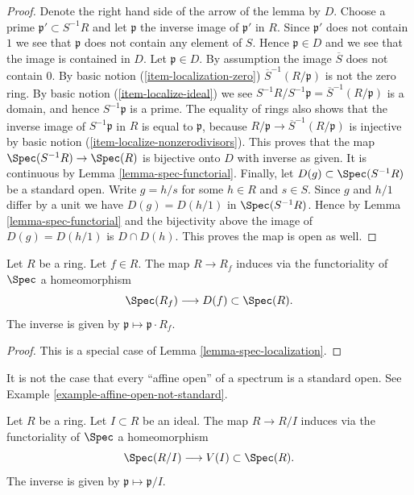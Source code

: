 \begin{proof}
Denote the right hand side of the arrow of the lemma by $D$.
Choose a prime $\mathfrak p' \subset S^{-1}R$ and let $\mathfrak p$
the inverse image of $\mathfrak p'$ in $R$. Since $\mathfrak p'$
does not contain $1$ we see that $\mathfrak p$ does not contain
any element of $S$. Hence $\mathfrak p \in D$ and we see that
the image is contained in $D$. Let $\mathfrak p \in D$.
By assumption the image $\overline{S}$ does not contain $0$.
By basic notion (\ref{item-localization-zero})
$\overline{S}^{-1}(R/\mathfrak p)$ is not the zero ring.
By basic notion (\ref{item-localize-ideal}) we see
$S^{-1}R / S^{-1}\mathfrak p = \overline{S}^{-1}(R/\mathfrak p)$
is a domain, and hence $S^{-1}\mathfrak p$ is a prime.
The equality of rings also shows that the inverse image of
$S^{-1}\mathfrak p$ in $R$ is equal to $\mathfrak p$,
because $R/\mathfrak p \to \overline{S}^{-1}(R/\mathfrak p)$
is injective by basic notion (\ref{item-localize-nonzerodivisors}).
This proves that the map $\Spec(S^{-1}R) \to \Spec(R)$
is bijective onto $D$ with inverse as given.
It is continuous by Lemma \ref{lemma-spec-functorial}.
Finally, let $D(g) \subset \Spec(S^{-1}R)$ be a standard
open. Write $g = h/s$ for some $h\in R$ and $s\in S$.
Since $g$ and $h/1$ differ by a unit we have $D(g) =
D(h/1)$ in $\Spec(S^{-1}R)$.
Hence by Lemma \ref{lemma-spec-functorial} and the bijectivity
above the image of $D(g) = D(h/1)$ is $D \cap D(h)$.
This proves the map is open as well.
\end{proof}

\begin{lemma}
\label{lemma-standard-open}
Let $R$ be a ring. Let $f \in R$.
The map $R \to R_f$ induces via the functoriality of
$\Spec$ a homeomorphism
$$
\Spec(R_f) \longrightarrow D(f) \subset \Spec(R).
$$
The inverse is given by $\mathfrak p \mapsto \mathfrak p \cdot R_f$.
\end{lemma}

\begin{proof}
This is a special case of Lemma \ref{lemma-spec-localization}.
\end{proof}

\noindent
It is not the case that every ``affine open'' of a
spectrum is a standard open. See
Example \ref{example-affine-open-not-standard}.

\begin{lemma}
\label{lemma-spec-closed}
Let $R$ be a ring. Let $I \subset R$ be an ideal.
The map $R \to R/I$ induces via the functoriality of
$\Spec$ a homeomorphism
$$
\Spec(R/I) \longrightarrow V(I) \subset \Spec(R).
$$
The inverse is given by $\mathfrak p \mapsto \mathfrak p / I$.
\end{lemma}

